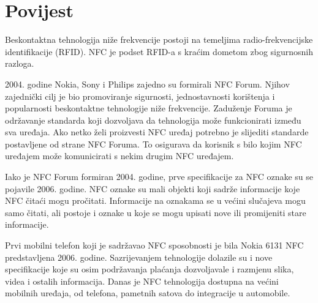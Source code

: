 \documentclass[times, utf8, zavrsni]{fer}
\begin{document}
\section{Povijest}
Beskontaktna tehnologija niže frekvencije postoji na temeljima radio-frekvencijske identifikacije (RFID). NFC je podset RFID-a s kraćim dometom zbog sigurnosnih razloga.\par 
2004. godine Nokia, Sony i Philips zajedno su formirali NFC Forum. Njihov zajednički cilj je bio promoviranje sigurnosti, jednostavnosti korištenja i popularnosti beskontaktne tehnologije niže frekvencije. Zaduženje Foruma je održavanje standarda koji dozvoljava da tehnologija može funkcionirati između sva uređaja. Ako netko želi proizvesti NFC uređaj potrebno je slijediti standarde postavljene od strane NFC Foruma. To osigurava da korisnik s bilo kojim NFC uređajem može komunicirati s nekim drugim NFC uređajem.\par
Iako je NFC Forum formiran 2004. godine, prve specifikacije za NFC oznake su se pojavile 2006. godine. NFC oznake su mali objekti koji sadrže informacije koje NFC čitaći mogu pročitati. Informacije na oznakama se u većini slučajeva mogu samo čitati, ali postoje i oznake u koje se mogu upisati nove ili promijeniti stare informacije.\par 
Prvi mobilni telefon koji je sadržavao NFC sposobnosti je bila Nokia 6131 NFC predstavljena 2006. godine. Sazrijevanjem tehnologije dolazile su i nove specifikacije koje su osim podržavanja plaćanja dozvoljavale i razmjenu slika, videa i ostalih informacija. Danas je NFC tehnologija dostupna na većini mobilnih uređaja, od telefona, pametnih satova do integracije u automobile.
\citep{3}
\end{document}
